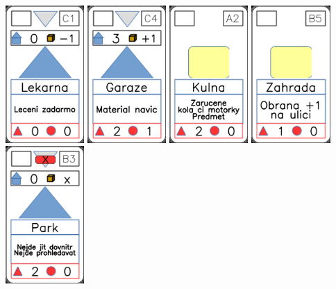 \documentclass[a4paper]{article}
\begin{document}
	\includegraphics[width=3.0cm]{img-3_10}
	\includegraphics[width=3.0cm]{img-3_13}
	\includegraphics[width=3.0cm]{img-2_16}
	\includegraphics[width=3.0cm]{img-2_24}
	\includegraphics[width=3.0cm]{img-3_22}
\end{document}
